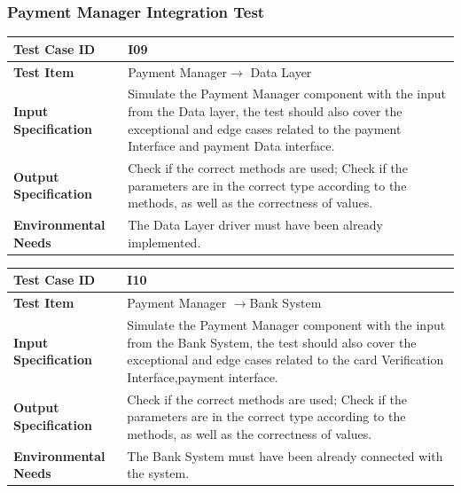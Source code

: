 \documentclass[a4paper,11pt]{article}
\begin{document}
		\subsubsection{Payment Manager Integration Test}
		\begin{table}[H] 
\begin{center}
\renewcommand\arraystretch{1.5}
\begin{tabular}{|p{5cm}|p{7cm}|}
 \hline
\textbf{Test Case ID}& I09\\
 \hline
\textbf{Test Item}&Payment Manager$\rightarrow$ Data Layer\\
 \hline
\textbf{Input Specification}&Simulate the Payment Manager component with the input from the Data layer, the test should also cover the exceptional and edge cases related to the payment Interface and payment Data interface.\\
 \hline
\textbf{Output Specification}&Check if the correct methods are used;
Check if the parameters are in the correct type according to the methods, as well as the correctness of values.\\
 \hline
 \textbf{Environmental Needs}&The Data Layer driver must have been already implemented.\\
 \hline
\end{tabular}
\end{center}
\end{table}		
\begin{table}[H] 
\begin{center}
\renewcommand\arraystretch{1.5}
\begin{tabular}{|p{5cm}|p{7cm}|}
 \hline
\textbf{Test Case ID}& I10\\
 \hline
\textbf{Test Item}&Payment Manager $\rightarrow$Bank System\\
 \hline
\textbf{Input Specification}&Simulate the Payment Manager component with the input from the Bank System, the test should also cover the exceptional and edge cases related to the card Verification Interface,payment interface.\\
 \hline
\textbf{Output Specification}&Check if the correct methods are used;
Check if the parameters are in the correct type according to the methods, as well as the correctness of values.\\
 \hline
 \textbf{Environmental Needs}&The Bank System must have been already connected with the system.\\
 \hline
\end{tabular}
\end{center}
\end{table}		
\end{document}
